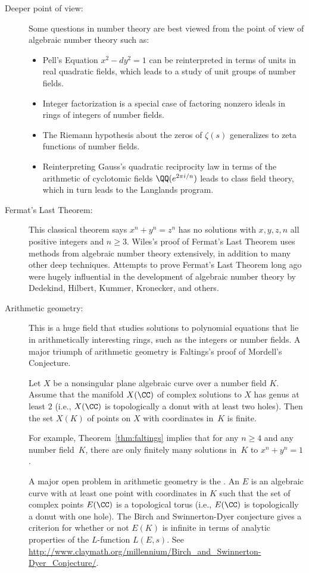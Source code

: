 \begin{description}
\item[Deeper point of view:]
Some questions in number theory
are best viewed from the point of view of algebraic number
theory such as:
\begin{itemize}
  \item
    Pell's Equation $x^2-dy^2=1$ can be reinterpreted
    in terms of units in real quadratic fields, which
    leads to a study of unit groups of number fields.
  \item
    Integer factorization is a special case of factoring nonzero
    ideals in rings of integers of number fields.
  \item
    The Riemann hypothesis about the zeros of $\zeta(s)$
    generalizes to zeta functions of number fields.
  \item
    Reinterpreting Gauss's quadratic reciprocity law in terms of
    the arithmetic of cyclotomic fields $\QQ(e^{2\pi i/n})$ leads
    to class field theory, which in turn leads to the Langlands
    program.
\end{itemize}

\item[Fermat's Last Theorem:]
This classical theorem says $x^n+y^n=z^n$ has no solutions with
$x,y,z,n$ all positive integers and $n \geq 3$. Wiles's
proof of Fermat's Last Theorem uses methods from
algebraic number theory extensively, in addition to many other deep
techniques.  Attempts to prove Fermat's Last Theorem long ago were
hugely influential in the development of algebraic number theory
by Dedekind, Hilbert, Kummer, Kronecker, and others.

\item[Arithmetic geometry:] This is a huge field that studies
solutions to polynomial equations that lie in arithmetically
interesting rings, such as the integers or number fields.  A
major triumph of arithmetic geometry is Faltings's proof of Mordell's
Conjecture.
\begin{theorem}[Faltings]\label{thm:faltings}
  Let $X$ be a nonsingular plane algebraic curve over a number
  field $K$.  Assume that the manifold $X(\CC)$ of complex solutions to
  $X$ has genus at least $2$ (i.e., $X(\CC)$ is topologically a donut
  with at least two holes).  Then the set $X(K)$ of points on $X$ with
  coordinates in~$K$ is finite.
\end{theorem}
For example, Theorem~\ref{thm:faltings} implies that for any $n\geq 4$
and any number field~$K$, there are only finitely many solutions
in~$K$ to $x^n+y^n=1$.

A major open problem in arithmetic geometry is the
.
An  $E$ is an algebraic curve with at
least one point
with coordinates in $K$ such that the set of complex points
$E(\CC)$ is a topological torus (i.e., $E(\CC)$ is topologically a donut
with one hole).
The Birch and Swinnerton-Dyer conjecture gives a
criterion for whether or not $E(K)$ is infinite in
terms of analytic properties of the $L$-function $L(E,s)$. See
\url{http://www.claymath.org/millennium/Birch_and_Swinnerton-Dyer_Conjecture/}.

\end{description}
